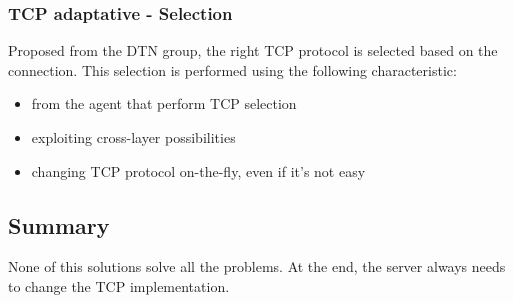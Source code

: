\subsubsection{TCP adaptative - Selection}
Proposed from the DTN group, the right TCP protocol is selected based on the
connection. This selection is performed using the following characteristic:
\begin{itemize}
\item from the agent that perform TCP selection
\item exploiting cross-layer possibilities
\item changing TCP protocol on-the-fly, even if it's not easy
\end{itemize}

\subsection{Summary}
None of this solutions solve all the problems. At the end, the server always
needs to change the TCP implementation.
